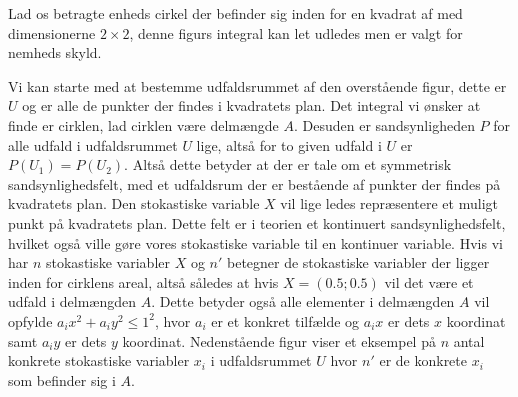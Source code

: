 \documentclass[../../SRP.tex]{subfiles}
\begin{document}
Lad os betragte enheds cirkel der befinder sig inden for en kvadrat af med dimensionerne $2\times 2$, denne figurs integral kan let udledes men er valgt for nemheds skyld.\\



\begin{center}
\end{center}

Vi kan starte med at bestemme udfaldsrummet af den overstående figur, dette er $U$ og er alle de punkter der findes i kvadratets plan. Det integral vi ønsker at finde er cirklen, lad cirklen være delmængde $A$. Desuden er sandsynligheden $P$ for alle udfald i udfaldsrummet $U$ lige, altså for to given udfald i $U$ er $P(U_1) = P(U_2)$. Altså dette betyder at der er tale om et symmetrisk sandsynlighedsfelt, med et udfaldsrum der er bestående af punkter der findes på kvadratets plan. Den stokastiske variable $X$ vil lige ledes repræsentere et muligt punkt på kvadratets plan. Dette felt er i teorien et kontinuert sandsynlighedsfelt, hvilket også ville gøre vores stokastiske variable til en kontinuer variable. Hvis vi har $n$ stokastiske variabler $X$ og $n'$ betegner de stokastiske variabler der ligger inden for cirklens areal, altså således at hvis $X = (0.5;0.5)$ vil det være et udfald i delmængden $A$. Dette betyder også alle elementer i delmængden $A$ vil opfylde $a_ix^2+a_iy^2 \leq 1^2$, hvor $a_i$ er et konkret tilfælde og $a_ix$ er dets $x$ koordinat samt $a_iy$ er dets $y$ koordinat. Nedenstående figur viser et eksempel på $n$ antal konkrete stokastiske variabler $x_i$ i udfaldsrummet $U$ hvor $n'$ er de konkrete $x_i$ som befinder sig i $A$.

\begin{center}
\end{center}
\end{document}
